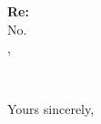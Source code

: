 \documentclass[12pt]{letter}
\date{\sendingDate}
\begin{document}
\begin{letter}{\recipientName \\
\recipientTitle \\
\recipientOrg \\
\recipientAddrLineOne \\
\recipientAddrLineTwo}

\opening{\textbf{Re: \matterTitle} \\
No. \recipientCaseNumber \\[2em]
\recipientSalutation,}

 \\[2em]         %

\closing{Yours sincerely,}\\[2em]

\end{letter}
\end{document}
